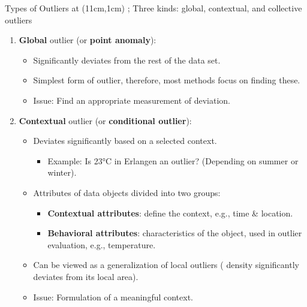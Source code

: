 \begin{frame}{Types of Outliers}
	\tikzoverlay at (11cm,1cm) {};
	Three kinds: global, contextual, and collective outliers
	\begin{enumerate}
		\item \textbf{Global} outlier (or \textbf{\color{faugray}point anomaly}):
		      \begin{itemize}
			      \item Significantly deviates from the rest of the data set.
			      \item Simplest form of outlier, therefore, most methods focus on finding these.
			      \item Issue: Find an appropriate measurement of deviation.
		      \end{itemize}
		\item \textbf{Contextual} outlier (or \textbf{\color{faugray}conditional outlier}):
		      \begin{itemize}
			      \item Deviates significantly based on a selected context.
			            \begin{itemize}
				            \item Example: Is 23°C in Erlangen an outlier? (Depending on summer or winter).
			            \end{itemize}
			      \item Attributes of data objects divided into two groups:
			            \begin{itemize}
				            \item \textbf{Contextual attributes}: define the context, e.g., time \& location.
				            \item \textbf{Behavioral attributes}: characteristics of the object, used in outlier evaluation, e.g., temperature.
			            \end{itemize}
			      \item Can be viewed as a generalization of local outliers ({\color{faugray} density significantly deviates from its local area}).
			      \item Issue: Formulation of a meaningful context.
		      \end{itemize}
	\end{enumerate}
\end{frame}


